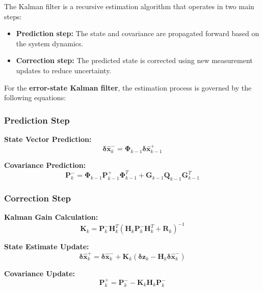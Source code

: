 \documentclass[conference]{IEEEtran}
\begin{document}
The Kalman filter is a recursive estimation algorithm that operates in two main steps: 
\begin{itemize}
    \item \textbf{Prediction step:} The state and covariance are propagated forward based on the system dynamics.
    \item \textbf{Correction step:} The predicted state is corrected using new measurement updates to reduce uncertainty.
\end{itemize}

For the \textbf{error-state Kalman filter}, the estimation process is governed by the following equations:

\subsubsection{Prediction Step}
\textbf{State Vector Prediction:}  
\begin{equation}
    \boldsymbol{\delta \hat{x}}_k^{-} = \mathbf{\Phi}_{k-1} \boldsymbol{\delta \hat{x}}_{k-1}^{+}
    \label{eq:kf_state_prediction}
\end{equation}

\textbf{Covariance Prediction:}  
\begin{equation}
    \mathbf{P}_k^{-} = \mathbf{\Phi}_{k-1} \mathbf{P}_{k-1}^{+} \mathbf{\Phi}_{k-1}^{T} + \mathbf{G}_{k-1} \mathbf{Q}_{k-1} \mathbf{G}_{k-1}^{T}
    \label{eq:kf_cov_prediction}
\end{equation}

\subsubsection{Correction Step}
\textbf{Kalman Gain Calculation:}  
\begin{equation}
    \mathbf{K}_{k} = \mathbf{P}_k^{-} \mathbf{H}_k^{T} \left(\mathbf{H}_k \mathbf{P}_k^{-} \mathbf{H}_k^{T} + \mathbf{R}_k \right)^{-1}
    \label{eq:kf_gain}
\end{equation}

\textbf{State Estimate Update:}  
\begin{equation}
    \boldsymbol{\delta \hat{x}}_k^{+} = \boldsymbol{\delta \hat{x}}_k^{-} + \mathbf{K}_k \left(\boldsymbol{\delta z}_k - \mathbf{H}_k \boldsymbol{\delta \hat{x}}_k^{-} \right)
    \label{eq:kf_state_update}
\end{equation}

\textbf{Covariance Update:}  
\begin{equation}
    \mathbf{P}_k^{+} = \mathbf{P}_k^{-} - \mathbf{K}_k \mathbf{H}_k \mathbf{P}_k^{-}
    \label{eq:kf_cov_update}
\end{equation}
\end{document}
